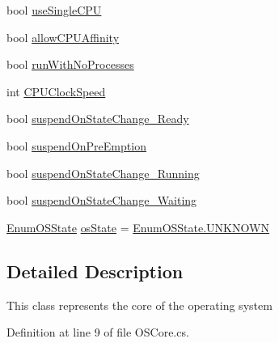 \begin{DoxyCompactItemize}
\item 
bool \hyperlink{class_c_p_u___o_s___simulator_1_1_operating___system_1_1_o_s_core_ac9667b36d2359ddf024ded0a57ba20be}{use\+Single\+C\+P\+U}
\item 
bool \hyperlink{class_c_p_u___o_s___simulator_1_1_operating___system_1_1_o_s_core_ad3fc35d621bf2c2afc8b2a66fc38d2c0}{allow\+C\+P\+U\+Affinity}
\item 
bool \hyperlink{class_c_p_u___o_s___simulator_1_1_operating___system_1_1_o_s_core_ac0526b86d9657a372e44664acf103438}{run\+With\+No\+Processes}
\item 
int \hyperlink{class_c_p_u___o_s___simulator_1_1_operating___system_1_1_o_s_core_a99f66d92928cea0a61e21ea427f16ab2}{C\+P\+U\+Clock\+Speed}
\item 
bool \hyperlink{class_c_p_u___o_s___simulator_1_1_operating___system_1_1_o_s_core_a2ee0e6e84ca8fd9b7d3daf279d038640}{suspend\+On\+State\+Change\+\_\+\+Ready}
\item 
bool \hyperlink{class_c_p_u___o_s___simulator_1_1_operating___system_1_1_o_s_core_a99875cff5880ff8dce2c77758389491b}{suspend\+On\+Pre\+Emption}
\item 
bool \hyperlink{class_c_p_u___o_s___simulator_1_1_operating___system_1_1_o_s_core_af35a9cd41325505df4cc3894c4b297b4}{suspend\+On\+State\+Change\+\_\+\+Running}
\item 
bool \hyperlink{class_c_p_u___o_s___simulator_1_1_operating___system_1_1_o_s_core_aebfddcf30c39c36876e07017fef6605f}{suspend\+On\+State\+Change\+\_\+\+Waiting}
\item 
\hyperlink{namespace_c_p_u___o_s___simulator_1_1_operating___system_a03a98a403abc737c106a8f92db5bffc1}{Enum\+O\+S\+State} \hyperlink{class_c_p_u___o_s___simulator_1_1_operating___system_1_1_o_s_core_ad428ed8c6f24743d016c9ba44ca129a5}{os\+State} = \hyperlink{namespace_c_p_u___o_s___simulator_1_1_operating___system_a03a98a403abc737c106a8f92db5bffc1a696b031073e74bf2cb98e5ef201d4aa3}{Enum\+O\+S\+State.\+U\+N\+K\+N\+O\+W\+N}
\end{DoxyCompactItemize}


\subsection{Detailed Description}
This class represents the core of the operating system 



Definition at line 9 of file O\+S\+Core.\+cs.




